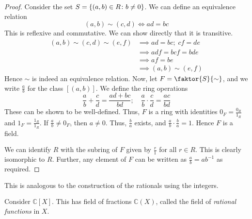 \begin{proof}
	Consider the set \( S = \qty{(a,b) \in R \colon b \neq 0} \).
	We can define an equivalence relation
	\[
		(a,b) \sim (c,d) \iff ad = bc
	\]
	This is reflexive and commutative.
	We can show directly that it is transitive.
	\begin{align*}
		(a,b) \sim (c,d) \sim (e,f) & \implies ad = bc;\; cf = de \\
		                            & \implies adf = bcf = bde    \\
		                            & \implies af = be            \\
		                            & \implies (a,b) \sim (e,f)
	\end{align*}
	Hence \( \sim \) is indeed an equivalence relation.
	Now, let \( F = \faktor{S}{\sim} \), and we write \( \frac{a}{b} \) for the class \( [(a,b)] \).
	We define the ring operations
	\[
		\frac{a}{b} + \frac{c}{d} = \frac{ad + bc}{bd};\quad \frac{a}{b} \cdot \frac{c}{d} = \frac{ac}{bd}
	\]
	These can be shown to be well-defined.
	Thus, \( F \) is a ring with identities \( 0_F = \frac{0_R}{1_R} \) and \( 1_F = \frac{1_R}{1_R} \).
	If \( \frac{a}{b} \neq 0_F \), then \( a \neq 0 \).
	Thus, \( \frac{b}{a} \) exists, and \( \frac{a}{b} \cdot \frac{b}{a} = 1 \).
	Hence \( F \) is a field.

	We can identify \( R \) with the subring of \( F \) given by \( \frac{r}{1} \) for all \( r \in R \).
	This is clearly isomorphic to \( R \).
	Further, any element of \( F \) can be written as \( \frac{a}{b} = ab^{-1} \) as required.
\end{proof}
This is analogous to the construction of the rationals using the integers.
\begin{example}
	Consider \( \mathbb C[X] \).
	This has field of fractions \( \mathbb C(X) \), called the field of \textit{rational functions} in \( X \).
\end{example}

